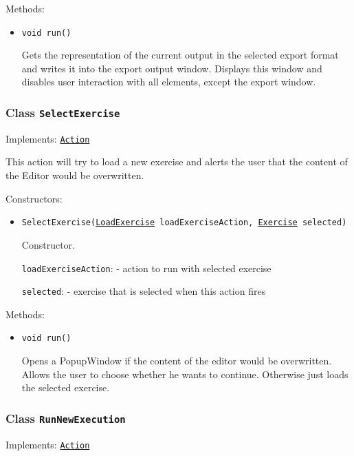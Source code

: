 Methods:
\begin{itemize}
\item \texttt{void run()}

Gets the representation of the current output in the selected export format
 and writes it into the export output window. Displays this window and disables
 user interaction with all elements, except the export window.

\end{itemize}

\subsubsection{Class \texttt{SelectExercise}}
\label{type:edu.kit.wavelength.client.view.action.SelectExercise}
Implements: \texttt{\hyperref[type:edu.kit.wavelength.client.view.action.Action]{Action}}

This action will try to load a new exercise and alerts the user that the
 content of the Editor would be overwritten.

Constructors:
\begin{itemize}
\item \texttt{SelectExercise(\hyperref[type:edu.kit.wavelength.client.view.action.LoadExercise]{LoadExercise} loadExerciseAction, \hyperref[type:edu.kit.wavelength.client.view.exercise.Exercise]{Exercise} selected)}

Constructor.

\texttt{loadExerciseAction}: - action to run with selected exercise

\texttt{selected}: - exercise that is selected when this action fires

\end{itemize}

Methods:
\begin{itemize}
\item \texttt{void run()}

Opens a PopupWindow if the content of the editor would be overwritten.
 Allows the user to choose whether he wants to continue.
 Otherwise just loads the selected exercise.

\end{itemize}

\subsubsection{Class \texttt{RunNewExecution}}
\label{type:edu.kit.wavelength.client.view.action.RunNewExecution}
Implements: \texttt{\hyperref[type:edu.kit.wavelength.client.view.action.Action]{Action}}

